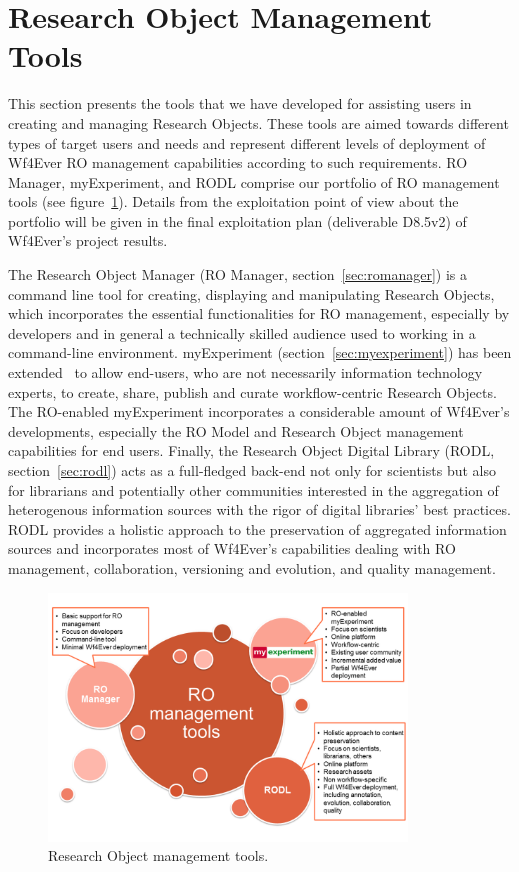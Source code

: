 \section{Research Object Management Tools}
\label{sec:romt}

This section presents the tools that we have developed for assisting users in creating and managing Research Objects. These tools are aimed towards different types of target users and needs and represent different levels of deployment of Wf4Ever RO management capabilities according to such requirements. RO Manager, myExperiment, and RODL comprise our portfolio of RO management tools (see figure~\ref{fig:romt}). Details from the exploitation point of view about the portfolio will be given in the final exploitation plan (deliverable D8.5v2) of Wf4Ever's project results.

The Research Object Manager (RO Manager, section~\ref{sec:romanager}) is a command line tool for creating, displaying and manipulating Research Objects, which incorporates the essential functionalities for RO management, especially by developers and in general a technically skilled audience used to working in a command-line environment. myExperiment (section~\ref{sec:myexperiment}) has been extended~\cite{DBLP:journals/fgcs/RoureGS09} to allow end-users, who are not necessarily information technology experts, to create, share, publish and curate workflow-centric Research Objects. The RO-enabled myExperiment incorporates a considerable amount of Wf4Ever's developments, especially the RO Model and Research Object management capabilities for end users. Finally, the Research Object Digital Library (RODL, section~\ref{sec:rodl}) acts as a full-fledged back-end not only for scientists but also for librarians and potentially other communities interested in the aggregation of heterogenous information sources with the rigor of digital libraries' best practices. RODL provides a holistic approach to the preservation of aggregated information sources and incorporates most of Wf4Ever's capabilities dealing with RO management, collaboration, versioning and evolution, and quality management. 


\begin{figure}
\begin{center}
\includegraphics[width=0.85\textwidth]{Figures/ROManagementTools-exploitation.png}
\end{center}
\caption{Research Object management tools.}
\label{fig:romt}
\end{figure}
